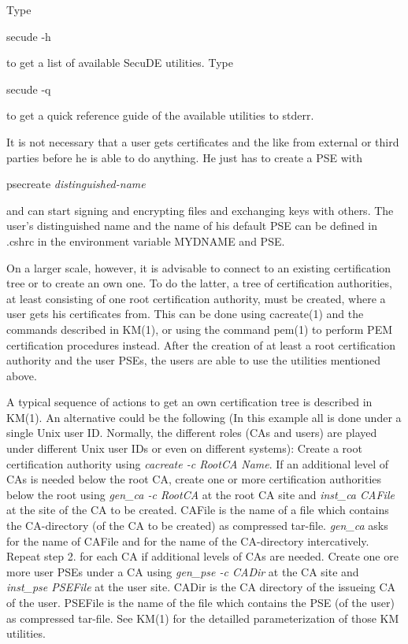 Type

\begin{center}
secude -h
\end{center}
 
to get a list of available SecuDE utilities. Type

\begin{center}
secude -q
\end{center}

to get a quick reference guide of the available utilities to stderr. 

It is not necessary that a user gets certificates and the like from external or
third parties before he is able to do anything. He just has to create a PSE
with
\begin{center}
psecreate {\em distinguished-name}
\end{center} 
and can start signing and encrypting files and exchanging keys with others. The user's
distinguished name and the name of his default PSE can be defined in .cshrc
in the environment variable MYDNAME and PSE.

On a larger scale, however, it is advisable to connect to an existing certification
tree or to create an own one. To do the latter, a tree of certification authorities, at least consisting of one root 
certification authority, must be created, where a user gets his certificates from. 
This can be done using cacreate(1) and the commands described in KM(1), or using
the command pem(1) to perform PEM certification procedures instead.
After the creation of at least
a root certification authority and the user PSEs, the users are able to
use the utilities mentioned above.
 
A typical sequence of actions to get an own certification tree is described in KM(1).
An alternative could be the following (In this example all 
is done under a single Unix user ID. Normally, the different roles (CAs and users) are
played under different Unix user IDs or even on different systems):
\be
\m Create a root certification authority using {\em cacreate -c RootCA Name}.
\m If an additional level of CAs is needed below the root CA, create one or more 
   certification authorities below the root
   using {\em gen\_ca -c RootCA} at the root CA site and {\em inst\_ca CAFile} at the site
   of the CA to be created. CAFile is the name of a file which contains the CA-directory
   (of the CA to be created) as compressed tar-file. {\em gen\_ca} asks for the name of 
   CAFile and for the name of the CA-directory intercatively.
\m Repeat step 2. for each CA if additional levels of CAs are needed.
\m Create one ore more user PSEs under a CA using {\em gen\_pse -c CADir} at the CA site
   and {\em inst\_pse PSEFile} at the user site. CADir is the CA directory of the issueing
   CA of the user. PSEFile is the name of the file which contains the PSE (of the user)
   as compressed tar-file. 
\ee
See KM(1) for the detailled parameterization of those KM utilities.
 
